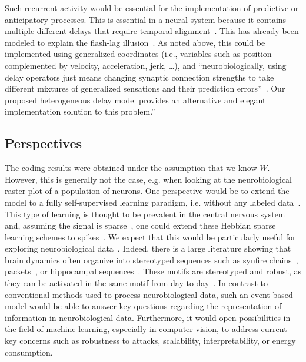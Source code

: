 \documentclass[runningheads]{llncs}
\begin{document}
Such recurrent activity would be essential for the implementation of predictive or anticipatory processes. This is essential in a neural system because it contains multiple different delays that require temporal alignment~\cite{hogendoorn_predictive_2019}. This has already been modeled to explain the flash-lag illusion~\cite{khoei_flash-lag_2017}. As noted above, this could be implemented using generalized coordinates (i.e., variables such as position complemented by velocity, acceleration, jerk, \ldots), and ``neurobiologically, using delay operators just means changing synaptic connection strengths to take different mixtures of generalized sensations and their prediction errors''~\cite{perrinet_active_2014}. Our proposed heterogeneous delay model provides an alternative and elegant implementation solution to this problem.''
%
\subsection{Perspectives}
The coding results were obtained under the assumption that we know $W$. However, this is generally not the case, e.g. when looking at the neurobiological raster plot of a population of neurons. One perspective would be to extend the model to a fully self-supervised learning paradigm, i.e. without any labeled data~\cite{barlow_unsupervised_1989}. This type of learning is thought to be prevalent in the central nervous system and, assuming the signal is sparse~\cite{olshausen_emergence_1996}, one could extend these Hebbian sparse learning schemes to spikes~\cite{perrinet_emergence_2004,masquelier_competitive_2009}. We expect that this would be particularly useful for exploring neurobiological data~\cite{mackevicius_unsupervised_2019}. Indeed, there is a large literature showing that brain dynamics often organize into stereotyped sequences such as synfire chains~\cite{ikegaya_synfire_2004}, packets~\cite{luczak_sequential_2007}, or hippocampal sequences~\cite{pastalkova_internally_2008,villette_internally_2015}. These motifs are stereotyped and robust, as they can be activated in the same motif from day to day~\cite{haimerl_internal_2019}. In contrast to conventional methods used to process neurobiological data, such an event-based model would be able to answer key questions regarding the representation of information in neurobiological data. Furthermore, it would open possibilities in the field of machine learning, especially in computer vision, to address current key concerns such as robustness to attacks, scalability, interpretability, or energy consumption.
\end{document}
